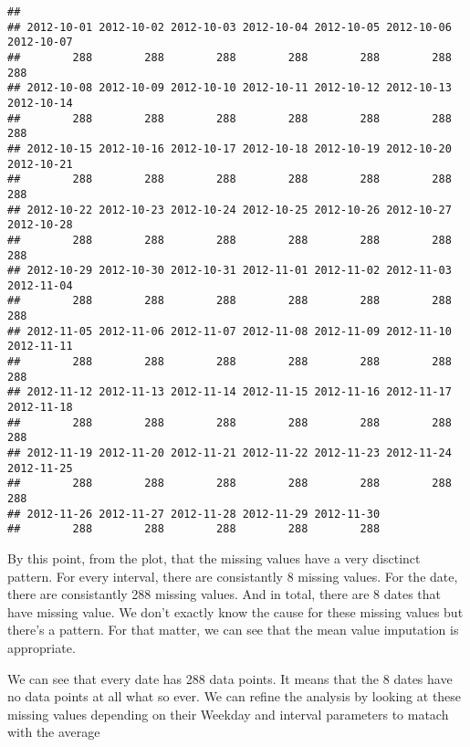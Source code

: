 \documentclass[
]{article}
\newenvironment{Shaded}{\begin{snugshade}}{\end{snugshade}}
\newcommand{\KeywordTok}[1]{\textcolor[rgb]{0.13,0.29,0.53}{\textbf{#1}}}
\newcommand{\NormalTok}[1]{#1}
\newcommand{\OperatorTok}[1]{\textcolor[rgb]{0.81,0.36,0.00}{\textbf{#1}}}
\begin{document}
\begin{Shaded}
\end{Shaded}

\begin{verbatim}
## 
## 2012-10-01 2012-10-02 2012-10-03 2012-10-04 2012-10-05 2012-10-06 2012-10-07 
##        288        288        288        288        288        288        288 
## 2012-10-08 2012-10-09 2012-10-10 2012-10-11 2012-10-12 2012-10-13 2012-10-14 
##        288        288        288        288        288        288        288 
## 2012-10-15 2012-10-16 2012-10-17 2012-10-18 2012-10-19 2012-10-20 2012-10-21 
##        288        288        288        288        288        288        288 
## 2012-10-22 2012-10-23 2012-10-24 2012-10-25 2012-10-26 2012-10-27 2012-10-28 
##        288        288        288        288        288        288        288 
## 2012-10-29 2012-10-30 2012-10-31 2012-11-01 2012-11-02 2012-11-03 2012-11-04 
##        288        288        288        288        288        288        288 
## 2012-11-05 2012-11-06 2012-11-07 2012-11-08 2012-11-09 2012-11-10 2012-11-11 
##        288        288        288        288        288        288        288 
## 2012-11-12 2012-11-13 2012-11-14 2012-11-15 2012-11-16 2012-11-17 2012-11-18 
##        288        288        288        288        288        288        288 
## 2012-11-19 2012-11-20 2012-11-21 2012-11-22 2012-11-23 2012-11-24 2012-11-25 
##        288        288        288        288        288        288        288 
## 2012-11-26 2012-11-27 2012-11-28 2012-11-29 2012-11-30 
##        288        288        288        288        288
\end{verbatim}

By this point, from the plot, that the missing values have a very
disctinct pattern. For every interval, there are consistantly 8 missing
values. For the date, there are consistantly 288 missing values. And in
total, there are 8 dates that have missing value. We don't exactly know
the cause for these missing values but there's a pattern. For that
matter, we can see that the mean value imputation is appropriate.

We can see that every date has 288 data points. It means that the 8
dates have no data points at all what so ever. We can refine the
analysis by looking at these missing values depending on their Weekday
and interval parameters to matach with the average
\end{document}

